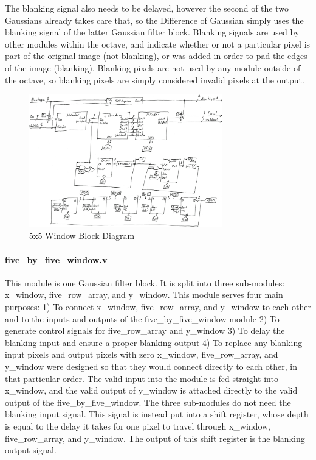 The blanking signal also needs to be delayed, however the second of the two 
Gaussians already takes care that, so the Difference of Gaussian simply uses the 
blanking signal of the latter Gaussian filter block. Blanking signals are used 
by other modules within the octave, and indicate whether or not a particular 
pixel is part of the original image (not blanking), or was added in order to pad 
the edges of the image (blanking). Blanking pixels are not used by any module 
outside of the octave, so blanking pixels are simply considered invalid pixels 
at the output.


\begin{figure}
    \centering
    \includegraphics[width=0.75\textwidth]{processed_image_pngs/5x5_block.png}
    \caption{5x5 Window Block Diagram}
    \label{fig:five_window}
\end{figure}

\paragraph{five\_by\_five\_window.v}

This module is one Gaussian filter block. It is split into three sub-modules: 
x\_window, five\_row\_array, and y\_window. This module serves four main purposes:
1) To connect x\_window, five\_row\_array, and y\_window to each other and to the 
   inputs and outputs of the five\_by\_five\_window module
2) To generate control signals for five\_row\_array and y\_window
3) To delay the blanking input and ensure a proper blanking output
4) To replace any blanking input pixels and output pixels with zero
x\_window, five\_row\_array, and y\_window were designed so that they would connect 
directly to each other, in that particular order. The valid input into the 
module is fed straight into x\_window, and the valid output of y\_window is 
attached directly to the valid output of the five\_by\_five\_window.
The three sub-modules do not need the blanking input signal. This signal is 
instead put into a shift register, whose depth is equal to the delay it takes 
for one pixel to travel through x\_window, five\_row\_array, and y\_window. The 
output of this shift register is the blanking output signal.

